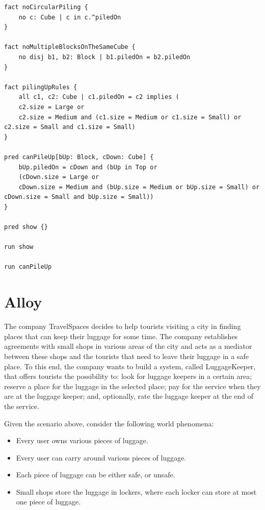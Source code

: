 \documentclass[12pt, a4paper]{report}
\begin{document}
\begin{enumerate}
\begin{lstlisting}[language=alloy]
fact noCircularPiling {
    no c: Cube | c in c.^piledOn
}

fact noMultipleBlocksOnTheSameCube {
    no disj b1, b2: Block | b1.piledOn = b2.piledOn
}

fact pilingUpRules {
    all c1, c2: Cube | c1.piledOn = c2 implies (
    c2.size = Large or
    c2.size = Medium and (c1.size = Medium or c1.size = Small) or c2.size = Small and c1.size = Small)
}

pred canPileUp[bUp: Block, cDown: Cube] {
    bUp.piledOn = cDown and (bUp in Top or
    (cDown.size = Large or
    cDown.size = Medium and (bUp.size = Medium or bUp.size = Small) or cDown.size = Small and bUp.size = Small))
}   

pred show {} 

run show

run canPileUp 
            \end{lstlisting}
    \end{enumerate}

    \section{Alloy}
        The company TravelSpaces decides to help tourists visiting a city in finding places that can keep their luggage 
        for some time. The company establishes agreements with small shops in various areas of the city and 
        acts as a mediator between these shops and the tourists that need to leave their luggage in a safe
        place. To this end, the company wants to build a system, called LuggageKeeper, that offers tourists 
        the possibility to: look for luggage keepers in a certain area; reserve a place for the luggage in 
        the selected place; pay for the service when they are at the luggage keeper; and, optionally, rate 
        the luggage keeper at the end of the service.
        
        Given the scenario above, consider the following world phenomena:
        \begin{itemize}
            \item Every user owns various pieces of luggage.
            \item Every user can carry around various pieces of luggage.
            \item Each piece of luggage can be either safe, or unsafe.
            \item Small shops store the luggage in lockers, where each locker can store at most one piece of luggage. 
        \end{itemize}
        
\end{document}
